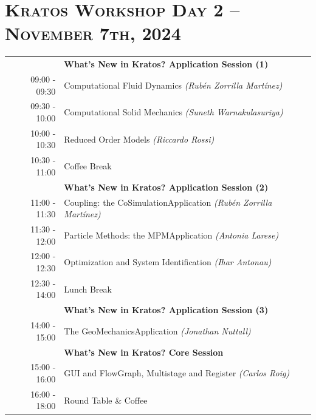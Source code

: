 \documentclass{article}
\begin{document}
\newpage
\section*{\centering \textsc{Kratos Workshop Day 2 -- November 7th, 2024}}

\begin{table}[h]\centering
   \begin{tabularx}{0.85\textwidth}{r|X}
      \toprule%
                    & {\large \textbf{What's New in Kratos? Application Session (1)}} \\%
      09:00 - 09:30 & Computational Fluid Dynamics \textit{(Rubén Zorrilla Martínez)}\\%
      09:30 - 10:00 & Computational Solid Mechanics \textit{(Suneth Warnakulasuriya)}\\%
      10:00 - 10:30 & Reduced Order Models \textit{(Riccardo Rossi)}\\%
      \midrule%
      \rowcolor{SeaGreen3!5!} 10:30 - 11:00 & Coffee Break \\%
      \midrule%
                    & {\large \textbf{What's New in Kratos? Application Session (2)}} \\%
      11:00 - 11:30 & Coupling: the CoSimulationApplication \textit{(Rubén Zorrilla Martínez)}\\%
      11:30 - 12:00 & Particle Methods: the MPMApplication \textit{(Antonia Larese)}\\%
      12:00 - 12:30 & Optimization and System Identification \textit{(Ihar Antonau)} \\%
      \midrule%
      \rowcolor{SeaGreen3!5!} 12:30 - 14:00 & Lunch Break \\%
      \midrule%
                    & {\large \textbf{What's New in Kratos? Application Session (3)}} \\%
      14:00 - 15:00 & The GeoMechanicsApplication \textit{(Jonathan Nuttall)}\\%
      \midrule%
                    & {\large \textbf{What's New in Kratos? Core Session}} \\%
      15:00 - 16:00 & GUI and FlowGraph, Multistage and Register \textit{(Carlos Roig)}\\%
      \midrule%
      16:00 - 18:00 & Round Table \& Coffee \\%
      \bottomrule
   \end{tabularx}
\end{table}
\end{document}
